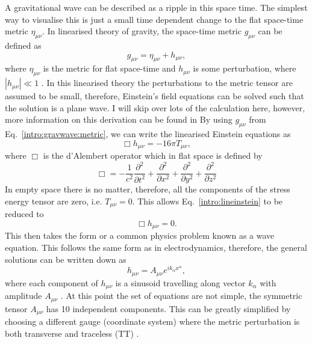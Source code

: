 A gravitational wave can be described as a ripple in this space time.
The simplest way to visualise this is just a small time dependent change to the flat space-time metric $\eta_{\mu\nu}$.
In linearised theory of gravity, the space-time metric $g_{\mu \nu}$ can be defined as
\begin{equation}
\label{intro:gravwave:metric}
    g_{\mu \nu} = \eta_{\mu \nu} + h_{\mu \nu},
\end{equation}
where $ \eta_{\mu \nu}$ is the metric for flat space-time and $h_{\mu \nu}$ is some perturbation, where $|h_{\mu \nu}| \ll 1$ \citep{flanagan2005BasicsGravitational}. 
In this linearised theory the perturbations to the metric tensor are assumed to be small, therefore, Einstein's field equations can be solved such that the solution is a plane wave. 
I will skip over lots of the calculation here, however, more information on this derivation can be found in \citep{flanagan2005BasicsGravitational,} 
By using $g_{\mu \nu}$ from Eq.~\ref{intro:gravwave:metric}, we can write the linearised Einstein equations as
\begin{equation}
\label{intro:lineinstein}
    \Box h_{\mu \nu} = -16 \pi T_{\mu\nu},
\end{equation}
where $\Box$ is the d'Alembert operator which in flat space is defined by
\begin{equation}
		\Box = -\frac{1}{c^2} \frac{\partial^2}{\partial t^2} + \frac{\partial^2}{\partial x^2} + \frac{\partial^2}{\partial y^2} + \frac{\partial^2}{\partial z^2}
\end{equation}
In empty space there is no matter, therefore, all the components of the stress energy tensor  are zero, i.e. $T_{\mu \nu} = 0$.
This allows Eq.~\ref{intro:lineinstein} to be reduced to
\begin{equation}
    \Box h_{\mu \nu} = 0.
\end{equation}
This then takes the form or a common physics problem known as a wave equation. 
This follows the same form as in electrodynamics, therefore, the general solutions can be written down as
\begin{equation}
    h_{\mu\nu} = A_{\mu\nu}e^{ik_{\alpha} x^{\alpha}},
\end{equation}
where each component of $h_{\mu \nu}$ is a sinusoid travelling along vector $k_{\alpha}$ with amplitude $A_{\mu\nu}$ \citep{capano2011SearchingGravitational}.
At this point the set of equations are not simple, the symmetric tensor $A_{\mu \nu}$ has 10 independent components.
This can be greatly simplified by choosing a different gauge (coordinate system) where the metric perturbation is both transverse and traceless (TT) \citep{flanagan2005BasicsGravitational}.
